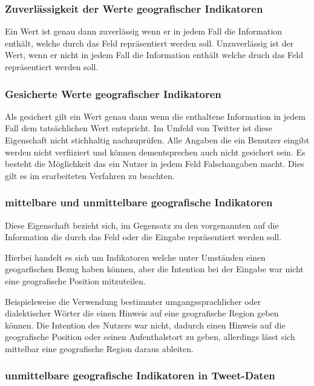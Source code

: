 			\subsubsection{Zuverlässigkeit der Werte geografischer Indikatoren}
				
				Ein Wert ist genau dann zuverlässig wenn er in jedem Fall die Information enthält, welche durch das Feld repräsentiert werden soll. 
				Unzuverlässig ist der Wert, wenn er nicht in jedem Fall die Information enthält welche druch das Feld repräsentiert werden soll.  

			\subsubsection{Gesicherte Werte geografischer Indikatoren} 
				
				Als gesichert gilt ein Wert genau dann wenn die enthaltene Information in jedem Fall dem tatsächlichen Wert entspricht. 
				Im Umfeld von Twitter ist diese Eigenschaft nicht stichhaltig nachzuprüfen. 
				Alle Angaben die ein Benutzer eingibt werden nicht verfiiziert und können dementsprechen auch nicht gesichert sein. 
				Es besteht die Möglichkeit das ein Nutzer in jedem Feld Falschangaben macht. 
				Dies gilt es im erarbeiteten Verfahren zu beachten.


			\subsubsection{mittelbare und unmittelbare geografische Indikatoren}
				
				Diese Eigenschaft bezieht sich, im Gegensatz zu den vorgenannten auf die Information die durch das Feld oder die Eingabe repräsentiert werden soll. 
				
				Hierbei handelt es sich um Indikatoren welche unter Umständen einen geogarfischen Bezug haben können, aber die Intention bei der Eingabe war nicht eine geografische Position mitzuteilen.

				Beispielsweise die Verwendung bestimmter umgangssprachlicher oder dialektischer Wörter die einen Hinweis auf eine geografische Region geben können.
				Die Intention des Nutzers war nicht, dadurch einen Hinweis auf die geografische Position oder seinen Aufenthalstort zu geben, allerdings lässt sich mittelbar eine geografische Region daraus ableiten. 

			\subsubsection{unmittelbare geografische Indikatoren in Tweet-Daten}
				
